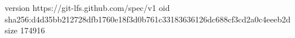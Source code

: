 version https://git-lfs.github.com/spec/v1
oid sha256:d4d35bb212728dfb1760e18f3d0b761c33183636126dc688cf3cd2a0c4eeeb2d
size 174916
